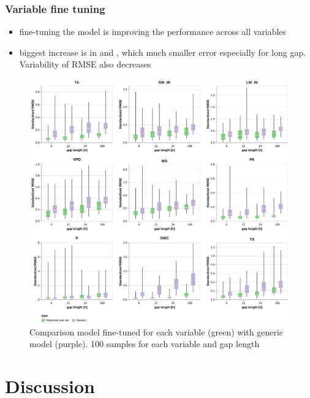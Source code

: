 \documentclass{article}
\newcommand{\imgwidth}{6in}
\let\Oldsection\section
\renewcommand{\section}{\FloatBarrier\Oldsection}
\begin{document}


\subsubsection{Variable fine tuning}

\begin{itemize}
    \item fine-tuning the model is improving the performance across all variables
    \item biggest increase is in  and , which much smaller error especially for long gap. Variability of RMSE also decreases
\end{itemize}

\begin{figure}
\centerline{\includegraphics[width=\imgwidth]{images/generic.png}}
\caption{Comparison model fine-tuned for each variable (green) with generic model (purple). 100 samples for each variable and gap length}
\label{fig:generic}
\end{figure}




\section{Discussion}
\end{document}
